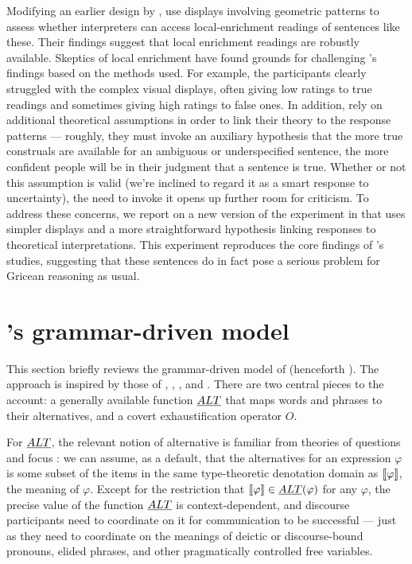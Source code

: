 \documentclass[leqno]{article}
\begin{document}
Modifying an earlier design by \citet{Geurts:Pouscoulous:2009},
\citeauthor{Chemla:Spector:2011} use displays involving geometric
patterns to assess whether interpreters can access local-enrichment
readings of sentences like these. Their findings suggest that local
enrichment readings are robustly available. Skeptics of local
enrichment have found grounds for challenging
\citeauthor{Chemla:Spector:2011}'s findings based on the methods
used. For example, the participants clearly struggled with the complex
visual displays, often giving low ratings to true readings and
sometimes giving high ratings to false ones. In addition,
\citeauthor{Chemla:Spector:2011} rely on additional theoretical
assumptions in order to link their theory to the response patterns ---
roughly, they must invoke an auxiliary hypothesis that the more true
construals are available for an ambiguous or underspecified sentence,
the more confident people will be in their judgment that a sentence is
true. Whether or not this assumption is valid (we're inclined to
regard it as a smart response to uncertainty), the need to invoke it
opens up further room for criticism. To address these concerns, we
report on a new version of the experiment in  that
uses simpler displays and a more straightforward hypothesis linking
responses to theoretical interpretations. This experiment reproduces
the core findings of \citeauthor{Chemla:Spector:2011}'s studies,
suggesting that these sentences do in fact pose a serious problem for
Gricean reasoning as usual.


\section{\CFS's grammar-driven model}\label{sec:cfs}

This section briefly reviews the grammar-driven model of
\citet{ChierchiaFoxSpector08} (henceforth \CFS).  The approach is
inspired by those of \citet{Chierchia01}, \citet{Sauerland01},
\citet{Spector:2007}, and \citet{Fox:2007,Fox:2009}. There are two
central pieces to the account: a generally available function $\emph{ALT}$
that maps words and phrases to their alternatives, and a covert
exhaustification operator $O$.

For $\emph{ALT}$, the relevant notion of alternative is familiar from
theories of questions and focus \citep{Groenendijk84,Rooth85,Rooth92}:
we can assume, as a default, that the alternatives for an expression
$\varphi$ is some subset of the items in the same type-theoretic
denotation domain as $\llbracket\varphi\rrbracket$, the meaning of $\varphi$. Except for the restriction that $\llbracket\varphi\rrbracket \in\emph{ALT}(\varphi)$ for any $\varphi$, the
precise value of the function $\emph{ALT}$ is context-dependent, and discourse
participants need to coordinate on it for communication to be successful --- just as they need to coordinate
on the meanings of deictic or discourse-bound pronouns, elided
phrases, and other pragmatically controlled free variables.
\end{document}
